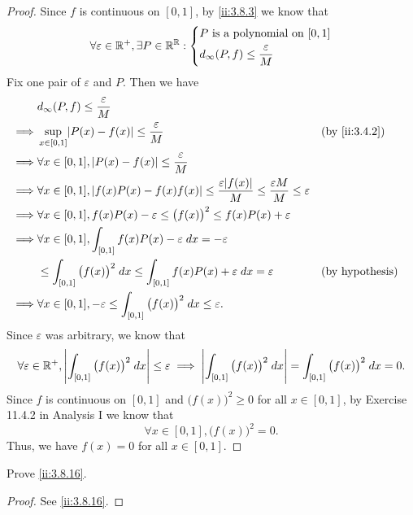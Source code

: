 \begin{proof}
  Since \(f\) is continuous on \([0, 1]\), by \cref{ii:3.8.3} we know that
  \[
    \forall \varepsilon \in \mathbb{R}^+, \exists P \in \mathbb{R}^{\mathbb{R}} : \begin{dcases}
      P \text{ is a polynomial on } [0, 1] \\
      d_{\infty}(P, f) \leq \dfrac{\varepsilon}{M}
    \end{dcases}
  \]
  Fix one pair of \(\varepsilon\) and \(P\).
  Then we have
  \begin{align*}
             & d_\infty(P, f) \leq \dfrac{\varepsilon}{M}                                                                                                                          \\
    \implies & \sup_{x \in [0, 1]} \abs{P(x) - f(x)} \leq \dfrac{\varepsilon}{M}                                                                       &  & \by{ii:3.4.2}          \\
    \implies & \forall x \in [0, 1], \abs{P(x) - f(x)} \leq \dfrac{\varepsilon}{M}                                                                                                 \\
    \implies & \forall x \in [0, 1], \abs{f(x) P(x) - f(x) f(x)} \leq \dfrac{\varepsilon \abs{f(x)}}{M} \leq \dfrac{\varepsilon M}{M} \leq \varepsilon                             \\
    \implies & \forall x \in [0, 1], f(x) P(x) - \varepsilon \leq \big(f(x)\big)^2 \leq f(x) P(x) + \varepsilon                                                                    \\
    \implies & \forall x \in [0, 1], \int_{[0, 1]} f(x) P(x) - \varepsilon \; dx = -\varepsilon                                                                                    \\
             & \leq \int_{[0, 1]} \big(f(x)\big)^2 \; dx \leq \int_{[0, 1]} f(x) P(x) + \varepsilon \; dx = \varepsilon                                &  & \text{(by hypothesis)} \\
    \implies & \forall x \in [0, 1], -\varepsilon \leq \int_{[0, 1]} \big(f(x)\big)^2 \; dx \leq \varepsilon.
  \end{align*}
  Since \(\varepsilon\) was arbitrary, we know that
  \[
    \forall \varepsilon \in \mathbb{R}^+, \left\lvert\int_{[0, 1]} \big(f(x)\big)^2 \; dx\right\rvert \leq \varepsilon \implies \left\lvert\int_{[0, 1]} \big(f(x)\big)^2 \; dx\right\rvert = \int_{[0, 1]} \big(f(x)\big)^2 \; dx = 0.
  \]
  Since \(f\) is continuous on \([0, 1]\) and \(\big(f(x)\big)^2 \geq 0\) for all \(x \in [0, 1]\), by Exercise 11.4.2 in Analysis I we know that
  \[
    \forall x \in [0, 1], \big(f(x)\big)^2 = 0.
  \]
  Thus, we have \(f(x) = 0\) for all \(x \in [0, 1]\).
\end{proof}

\begin{ex}\label{ii:ex:3.8.9}
  Prove \cref{ii:3.8.16}.
\end{ex}

\begin{proof}
  See \cref{ii:3.8.16}.
\end{proof}

